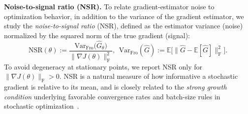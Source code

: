 \vspace{-2mm}
\textbf{Noise-to-signal ratio (NSR).}
To relate gradient-estimator noise to optimization behavior, in addition to the variance of the gradient estimator, we study the \emph{noise-to-signal ratio} (NSR),
defined as the estimator variance (noise) normalized by the squared norm of the true gradient (signal):
\[
\mathrm{NSR}(\theta)
:=\frac{\mathrm{Var}_{\mathrm{Fro}}\big(\widehat G_\theta\big)}{\|\nabla J(\theta)\|_{\mathrm{F}}^2},
\ \ 
\mathrm{Var}_{\mathrm{Fro}}(\widehat G)
:=\mathbb{E}\big[\|\widehat G-\mathbb{E}[\widehat G]\|_{\mathrm{F}}^2\big].
\]
To avoid degeneracy at stationary points, we report NSR only for $\|\nabla J(\theta)\|_{\mathrm{F}}>0$. NSR is a natural measure of how informative a stochastic gradient is relative to its mean, and is closely related to the \emph{strong growth condition} underlying favorable convergence rates and batch-size rules in stochastic optimization~\cite{bottou18siamreview-sgd, cevher19optletters-sgdlinearconvergence}.



